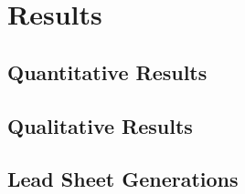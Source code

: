 \chapter{Results}

\section{Quantitative Results}

\section{Qualitative Results}

\section{Lead Sheet Generations}